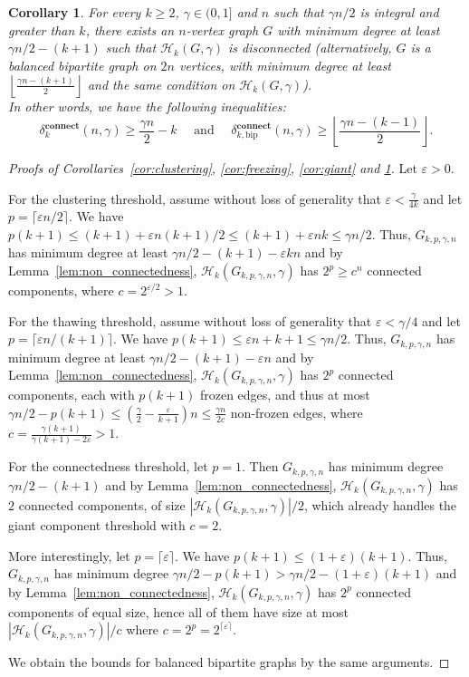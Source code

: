 \documentclass[11pt,a4paper]{article}
\newtheorem{corollary}[theorem]{Corollary}
\theoremstyle{definition}
\newcommand{\eps}{\varepsilon}
\begin{document}
\begin{corollary}\label{cor:non_connectedness}
  For every $k \ge 2$, $\gamma \in (0,1]$ and $n$ such that $\gamma n/2$ is integral and greater than $k$, there exists an $n$-vertex graph $G$ with minimum degree at least $\gamma n/2 - (k+1)$ such that $\mathcal{H}_{k}(G,\gamma)$ is disconnected (alternatively, $G$ is a balanced bipartite graph on $2n$ vertices, with minimum degree at least $\left\lfloor \frac{\gamma n - (k+1)}2 \right\rfloor$ and the same condition on $\mathcal{H}_{k}(G,\gamma)$).\\ 
  In other words, we have the following inequalities:
  \[
  \delta^{\mathbf{connect}}_k(n,\gamma)\ge    \frac{\gamma n}2-k
  \quad \text{ and } \quad
  \delta^{\mathbf{connect}}_{k,\mathrm{bip}}(n,\gamma)
  \ge \left\lfloor \frac{\gamma n - (k-1)}2 \right\rfloor.
  \]
\end{corollary}

\begin{proof}[Proofs of
  Corollaries~\ref{cor:clustering}, \ref{cor:freezing}, \ref{cor:giant} and \ref{cor:non_connectedness}] Let $\eps >0$.
  
  For the clustering threshold, assume without loss of generality that $\eps < \frac{\gamma}{4k}$ and let $p = \lceil \eps n/2\rceil$. We have $p(k+1)\le (k+1) +\eps n(k+1)/2 \le (k+1) +\eps nk \le \gamma n/2$. Thus, $G_{k,p,\gamma,n}$ has minimum degree at least $\gamma n/2- (k+1) - \eps kn$ and by Lemma~\ref{lem:non_connectedness}, $\mathcal{H}_{k}(G_{k,p,\gamma,n},\gamma)$ has $2^p \ge c^n$ connected components, where $c=2^{\eps/2}>1$.

  For the thawing threshold, assume without loss of generality that $\eps < \gamma/4$ and let $p = \lceil \eps n/(k+1)\rceil$. We have $p(k+1) \le \eps n + k+1 \le \gamma n/2$. Thus, $G_{k,p,\gamma,n}$ has minimum degree at least $\gamma n/2- (k+1) -\eps n$ and by Lemma~\ref{lem:non_connectedness}, $\mathcal{H}_{k}(G_{k,p,\gamma,n},\gamma)$ has $2^p$ connected components, each with $p(k+1)$ frozen edges, and thus at most $\gamma n/2 - p(k+1) \le (\frac{\gamma}2 - \frac{\eps}{k+1})n \le  \frac{\gamma n}{2c}$ non-frozen edges, where $c =\frac{\gamma(k+1)}{\gamma(k+1)-2\eps}>1$.

  For the connectedness threshold, let $p = 1$. Then $G_{k,p,\gamma,n}$ has minimum degree $\gamma n/2 -(k+1)$ and by Lemma~\ref{lem:non_connectedness}, $\mathcal{H}_{k}(G_{k,p,\gamma,n},\gamma)$ has $2$ connected components, of size $|\mathcal{H}_{k}(G_{k,p,\gamma,n},\gamma)|/2$, which already handles the giant component threshold with $c=2$. 
  
  More interestingly, let $p = \lceil\eps\rceil$. We have $p(k+1) \le (1+\eps)(k+1)$. Thus, $G_{k,p,\gamma,n}$ has minimum degree $\gamma n/2 - p(k+1) > \gamma n/2- (1+\eps)(k+1)$ and by Lemma~\ref{lem:non_connectedness}, $\mathcal{H}_{k}(G_{k,p,\gamma,n},\gamma)$ has $2^p$ connected components of equal size, hence all of them have size at most $|\mathcal{H}_{k}(G_{k,p,\gamma,n},\gamma)|/c$ where $c = 2^p = 2^{\lceil \eps \rceil}$.

  We obtain the bounds for balanced bipartite graphs by the same arguments.
\end{proof}
\end{document}

